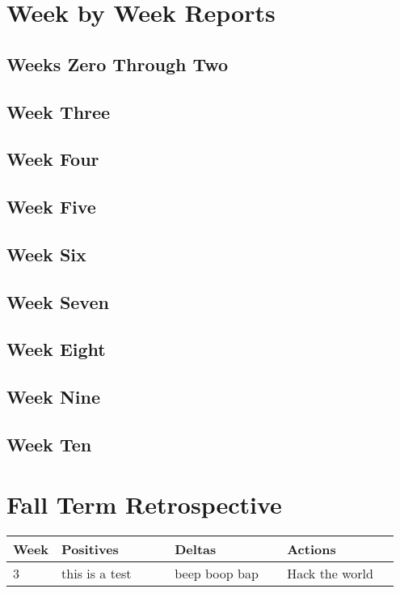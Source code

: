 \documentclass[10pt,onecolumn,journal,draftclsnofoot]{IEEEtran}
\begin{document}
\section{Week by Week Reports}

\subsection{Weeks Zero Through Two}

\subsection{Week Three}

\subsection{Week Four}

\subsection{Week Five}

\subsection{Week Six}

\subsection{Week Seven}

\subsection{Week Eight}

\subsection{Week Nine}

\subsection{Week Ten}

\section{Fall Term Retrospective}

\begin{center}
	\begin{tabular}{| p{0.05\linewidth} | p{0.3\linewidth} | p{0.3\linewidth} | p{0.3\linewidth} |}\hline
		Week & Positives & Deltas & Actions \\ \hline
		3 & this is a test  & beep boop bap & Hack the world \\ \hline
	\end{tabular}
\end{center}
\end{document}
